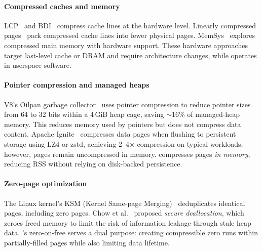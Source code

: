 \paragraph{Compressed caches and memory}
LCP~\cite{pekhimenko2012linearly} and BDI~\cite{pekhimenko2012linearly}
compress cache lines at the hardware level.  Linearly compressed
pages~\cite{pekhimenko2012linearly} pack compressed cache lines
into fewer physical pages.  MemSys~\cite{vijaykumar2015case}
explores compressed main memory with hardware support.
These hardware approaches target
last-level cache or DRAM and require architecture changes, while \sys
operates in userspace software.

\paragraph{Pointer compression and managed heaps}
V8's Oilpan garbage collector~\cite{nickel2024oilpan} uses pointer
compression to reduce pointer sizes from 64 to 32 bits within a 4\,GiB
heap cage, saving $\sim$16\% of managed-heap memory.  This reduces
memory used by pointers but does not compress data content.
Apache Ignite~\cite{ignite2024compression} compresses data pages when
flushing to persistent storage using LZ4 or zstd, achieving 2--4$\times$
compression on typical workloads; however, pages remain uncompressed in
memory.  \sys compresses pages \emph{in memory}, reducing RSS without
relying on disk-backed persistence.

\paragraph{Zero-page optimization}
The Linux kernel's KSM (Kernel Same-page
Merging)~\cite{arcangeli2009ksm} deduplicates identical pages,
including zero pages.  Chow et al.~\cite{chow2005shredding} proposed
\emph{secure deallocation}, which zeroes freed memory to limit
the risk of information leakage through stale heap data.  \sys's zero-on-free
serves a dual purpose: creating compressible zero runs within
partially-filled pages while also limiting data lifetime.
